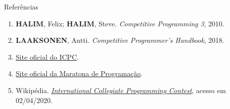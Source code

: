 \begin{frame}[fragile]{Referências}

    \begin{enumerate}
        \item \textbf{HALIM}, Felix; \textbf{HALIM}, Steve. \textit{Competitive Programming 3}, 2010.
        \item \textbf{LAAKSONEN}, Antti. \textit{Competitive Programmer's Handbook}, 2018.

        \item \href{https://icpc.baylor.edu/}{Site oficial do ICPC}.

        \item \href{http://maratona.ime.usp.br/}{Site oficial da Maratona de Programação}.

        \item Wikipédia. \href{https://en.wikipedia.org/wiki/ACM\_International\_Collegiate\_Programming\_Contest}{\it International Collegiate Programming Contest}, acesso em 02/04/2020.


    \end{enumerate}

\end{frame}
